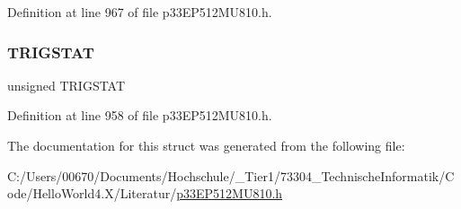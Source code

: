 Definition at line 967 of file p33\+E\+P512\+M\+U810.\+h.

\mbox{\label{structtag_i_c8_c_o_n2_b_i_t_s_ab379549de54ac93ad4aa73686c34cb7c}} 
\subsubsection{\texorpdfstring{T\+R\+I\+G\+S\+T\+AT}{TRIGSTAT}}
{\footnotesize\ttfamily unsigned T\+R\+I\+G\+S\+T\+AT}



Definition at line 958 of file p33\+E\+P512\+M\+U810.\+h.



The documentation for this struct was generated from the following file\+:\begin{DoxyCompactItemize}
\item 
C\+:/\+Users/00670/\+Documents/\+Hochschule/\+\_\+\+Tier1/73304\+\_\+\+Technische\+Informatik/\+Code/\+Hello\+World4.\+X/\+Literatur/\hyperlink{p33_e_p512_m_u810_8h}{p33\+E\+P512\+M\+U810.\+h}\end{DoxyCompactItemize}
